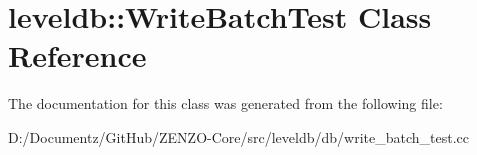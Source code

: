 \hypertarget{classleveldb_1_1_write_batch_test}{}\section{leveldb\+::Write\+Batch\+Test Class Reference}
\label{classleveldb_1_1_write_batch_test}


The documentation for this class was generated from the following file\+:\begin{DoxyCompactItemize}
\item 
D\+:/\+Documentz/\+Git\+Hub/\+Z\+E\+N\+Z\+O-\/\+Core/src/leveldb/db/write\+\_\+batch\+\_\+test.\+cc\end{DoxyCompactItemize}
